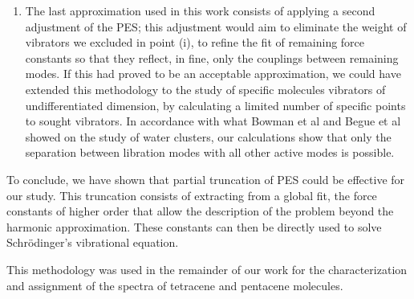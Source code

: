 \begin{enumerate}
	\item The last approximation used in this work consists of applying a second adjustment of the PES; this adjustment would aim to eliminate the weight of vibrators we excluded in point (i), to refine the fit of remaining force constants so that they reflect, in fine, only the couplings between remaining modes. If this had proved to be an acceptable approximation, we could have extended this methodology to the study of specific molecules vibrators of undifferentiated dimension, by calculating a limited number of specific points to sought vibrators. In accordance with what Bowman et al \cite{bowman2008variational} and Begue et al \cite{begue2010calculation}  showed on the study of water clusters, our calculations show that only the separation between libration modes with all other active modes is possible.
	
\end{enumerate}

To conclude, we have shown that partial truncation of PES could be effective for our study. This truncation consists of extracting from a global fit, the force constants of higher order that allow the description of the problem beyond the harmonic approximation. These constants can then be directly used to solve Schr\"{o}dinger's vibrational equation.

This methodology was used in the remainder of our work for the characterization and assignment of the spectra of tetracene and pentacene molecules.

